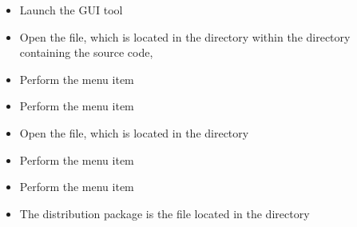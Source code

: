\begin{itemize}
\item Launch the  GUI tool
\item\exSp{} Open the  file, which is located in the
 directory within the directory containing the \mplusm{} source
code, 
\item\exSp{} Perform the menu item 
\item\exSp{} Perform the menu item 
\item\exSp{} Open the  file, which is located in the 
directory
\item\exSp{} Perform the menu item 
\item\exSp{} Perform the menu item 
\item\exSp{} The distribution package is the  file located in the
 directory
\end{itemize}
\tertiaryEnd{}
\TBD{}
\tertiaryEnd{}
\TBD{}
\tertiaryEnd{}
\secondaryEnd{}
\appendixEnd{}
